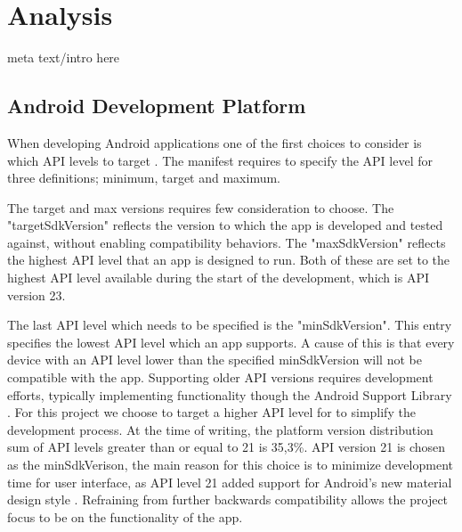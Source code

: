 \section{Analysis}
meta text/intro here
\subsection{Android Development Platform}
When developing Android applications one of the first choices to consider is which API levels to target \cite{usesSDK}.
The manifest requires to specify the API level for three definitions; minimum, target and maximum.

The target and max versions requires few consideration to choose.
The "targetSdkVersion" reflects the version to which the app is developed and tested against, without enabling compatibility behaviors.
The "maxSdkVersion" reflects the highest API level that an app is designed to run.
Both of these are set to the highest API level available during the start of the development, which is API version 23.

The last API level which needs to be specified is the "minSdkVersion".
This entry specifies the lowest API level which an app supports.
A cause of this is that every device with an API level lower than the specified minSdkVersion will not be compatible with the app.
Supporting older API versions requires development efforts, typically implementing functionality though the Android Support Library \cite{androidSL}.
For this project we choose to target a higher API level for to simplify the development process.
At the time of writing, the platform version distribution sum of API levels greater than or equal to 21 is 35,3\%.
API version 21 is chosen as the minSdkVerison, the main reason for this choice is to minimize development time for user interface, as API level 21 added support for Android's new material design style \cite{android5API}. Refraining from further backwards compatibility allows the project focus to be on the functionality of the app. 